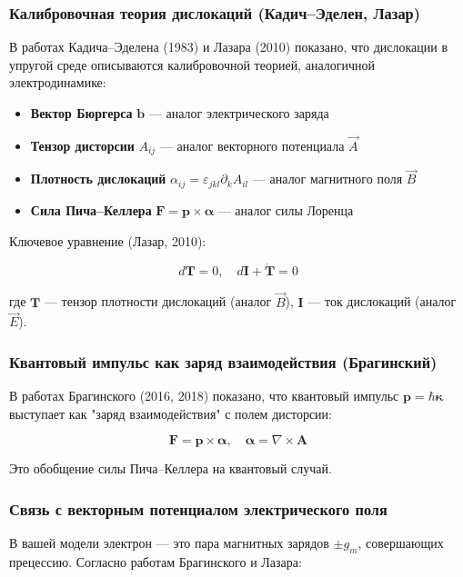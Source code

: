 \documentclass[12pt]{article}
\begin{document}
\subsubsection{Калибровочная теория дислокаций (Кадич–Эделен, Лазар)}

В работах Кадича–Эделена (1983) и Лазара (2010) показано, что дислокации в упругой среде описываются калибровочной теорией, аналогичной электродинамике:

\begin{itemize}
\item \textbf{Вектор Бюргерса} $\boldsymbol{b}$ — аналог электрического заряда
\item \textbf{Тензор дисторсии} $A_{ij}$ — аналог векторного потенциала $\vec{A}$
\item \textbf{Плотность дислокаций} $\alpha_{ij} = \varepsilon_{jkl} \partial_k A_{il}$ — аналог магнитного поля $\vec{B}$
\item \textbf{Сила Пича–Келлера} $\boldsymbol{F} = \boldsymbol{p} \times \boldsymbol{\alpha}$ — аналог силы Лоренца
\end{itemize}

Ключевое уравнение (Лазар, 2010):

\[
d\boldsymbol{T} = 0, \quad d\boldsymbol{I} + \dot{\boldsymbol{T}} = 0
\]

где $\boldsymbol{T}$ — тензор плотности дислокаций (аналог $\vec{B}$), $\boldsymbol{I}$ — ток дислокаций (аналог $\vec{E}$).

\subsubsection{Квантовый импульс как заряд взаимодействия (Брагинский)}

В работах Брагинского (2016, 2018) показано, что квантовый импульс $\boldsymbol{p} = \hbar \boldsymbol{\kappa}$ выступает как "заряд взаимодействия" с полем дисторсии:

\[
\boldsymbol{F} = \boldsymbol{p} \times \boldsymbol{\alpha}, \quad \boldsymbol{\alpha} = \nabla \times \boldsymbol{A}
\]

Это обобщение силы Пича–Келлера на квантовый случай.

\subsubsection{Связь с векторным потенциалом электрического поля}

В вашей модели электрон — это пара магнитных зарядов $\pm g_m$, совершающих прецессию. Согласно работам Брагинского и Лазара:
\end{document}
